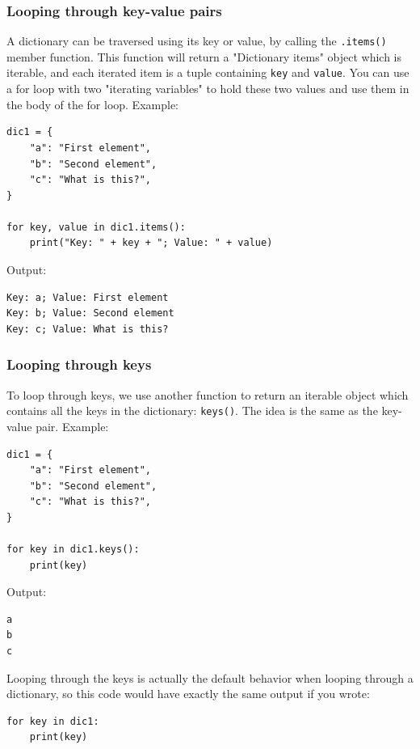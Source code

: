 \documentclass[12pt]{book}
\begin{document}
\subsubsection{Looping through key-value pairs}
\label{sec:orgb9b1ff8}
A dictionary can be traversed using its key or value, by calling the \texttt{.items()} member function. This function will return a "Dictionary items" object which is iterable, and each iterated item is a tuple containing \texttt{key} and \texttt{value}. You can use a for loop with two "iterating variables" to hold these two values and use them in the body of the for loop. Example:
\begin{verbatim}
dic1 = {
    "a": "First element",
    "b": "Second element",
    "c": "What is this?",
}

for key, value in dic1.items():
    print("Key: " + key + "; Value: " + value)
\end{verbatim}
Output:
\begin{verbatim}
Key: a; Value: First element
Key: b; Value: Second element
Key: c; Value: What is this?
\end{verbatim}
\subsubsection{Looping through keys}
\label{sec:orge4a8921}
To loop through keys, we use another function to return an iterable object which contains all the keys in the dictionary: \texttt{keys()}. The idea is the same as the key-value pair. Example:
\begin{verbatim}
dic1 = {
    "a": "First element",
    "b": "Second element",
    "c": "What is this?",
}

for key in dic1.keys():
    print(key)
\end{verbatim}
Output:
\begin{verbatim}
a
b
c
\end{verbatim}

Looping through the keys is actually the default behavior when looping through a dictionary, so this code would have exactly the same output if you wrote:
\begin{verbatim}
for key in dic1:
    print(key)
\end{verbatim}
\end{document}

